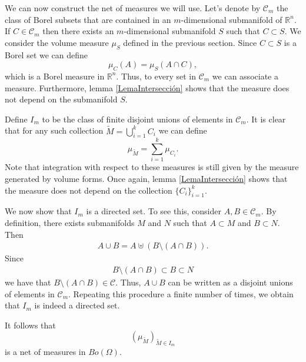\documentclass[%
 aip,
 amsmath,amssymb,
 reprint,%
jmp]{revtex4-2}
\begin{document}
We can now construct the net of measures we will use. Let's denote by $\mathcal{C}_{m}$ the class of Borel subsets that are contained in an $m$-dimensional submanifold of $\mathbb{R}^{n}$. If $C\in\mathcal{C}_{m}$ then there exists an $m$-dimensional submanifold $S$ such that $C\subset S$. We consider the volume measure $\mu_{S}$ defined in the previous section. Since $C\subset S$ is a Borel set we can define
\begin{equation*}
    \mu_{C}(A) = \mu_{S}(A\cap C),
\end{equation*}
which is a Borel measure in $\mathbb{R}^{n}$. Thus, to every set in $\mathcal{C}_{m}$ we can associate a measure. Furthermore, lemma \ref{LemaIntersección} shows that the measure does not depend on the submanifold $S$.

Define $I_{m}$ to be the class of finite disjoint unions of elements in $\mathcal{C}_{m}$. It is clear that for any such collection $\tilde{M} = \bigcup_{i=1}^{k}C_{i}$ we can define
\begin{equation*}
    \mu_{\tilde{M}} = \sum_{i=1}^{k}\mu_{C_{i}}.
\end{equation*}
Note that integration with respect to these measures is still given by the measure generated by volume forms. Once again, lemma \ref{LemaIntersección} shows that the measure does not depend on the collection $\{C_{i}\}_{i=1}^{k}$.

We now show that $I_{m}$ is a directed set. To see this, consider $A,B\in\mathcal{C}_{m}$. By definition, there exists submanifolds $M$ and $N$ such that $A\subset M$ and $B\subset N$. Then
\begin{align*}
    A\cup B = A \uplus (B\setminus (A\cap B)).
\end{align*}
Since
\begin{align*}
    B\setminus (A\cap B) \subset B \subset N
\end{align*}
we have that $B\setminus (A\cap B)\in \mathcal{C}$. Thus, $A\cup B$ can be written as a disjoint unions of elements in $\mathcal{C}_{m}$. Repeating this procedure a finite number of times, we obtain that $I_{m}$ is indeed a directed set.

It follows that
\begin{equation*}
    (\mu_{\tilde{M}})_{\tilde{M}\in I_{m}}
\end{equation*}
is a net of measures in $Bo(\Omega)$.
\end{document}
